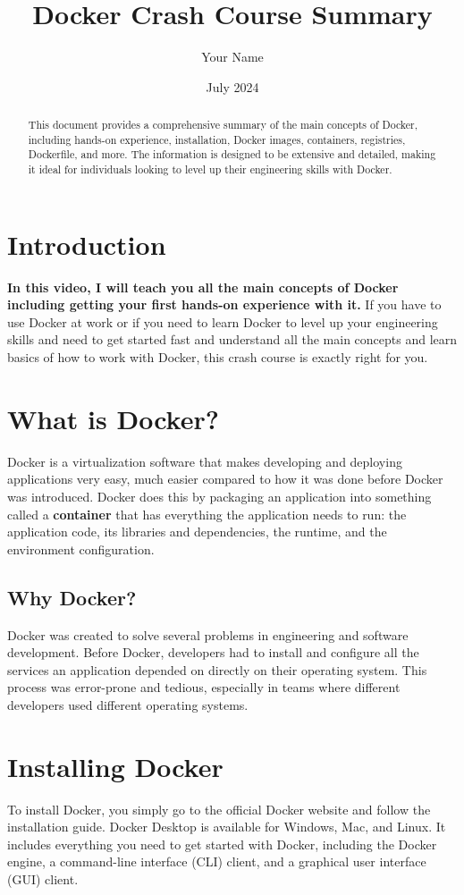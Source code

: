\documentclass[12pt]{article}
\title{Docker Crash Course Summary}
\author{Your Name}
\date{July 2024}
\begin{document}
\maketitle

\begin{abstract}
This document provides a comprehensive summary of the main concepts of Docker, including hands-on experience, installation, Docker images, containers, registries, Dockerfile, and more. The information is designed to be extensive and detailed, making it ideal for individuals looking to level up their engineering skills with Docker.
\end{abstract}

\section{Introduction}

\textbf{In this video, I will teach you all the main concepts of Docker including getting your first hands-on experience with it.} If you have to use Docker at work or if you need to learn Docker to level up your engineering skills and need to get started fast and understand all the main concepts and learn basics of how to work with Docker, this crash course is exactly right for you.

\section{What is Docker?}
Docker is a virtualization software that makes developing and deploying applications very easy, much easier compared to how it was done before Docker was introduced. Docker does this by packaging an application into something called a \textbf{container} that has everything the application needs to run: the application code, its libraries and dependencies, the runtime, and the environment configuration.

\subsection{Why Docker?}
Docker was created to solve several problems in engineering and software development. Before Docker, developers had to install and configure all the services an application depended on directly on their operating system. This process was error-prone and tedious, especially in teams where different developers used different operating systems.

\section{Installing Docker}
To install Docker, you simply go to the official Docker website and follow the installation guide. Docker Desktop is available for Windows, Mac, and Linux. It includes everything you need to get started with Docker, including the Docker engine, a command-line interface (CLI) client, and a graphical user interface (GUI) client.
\end{document}
